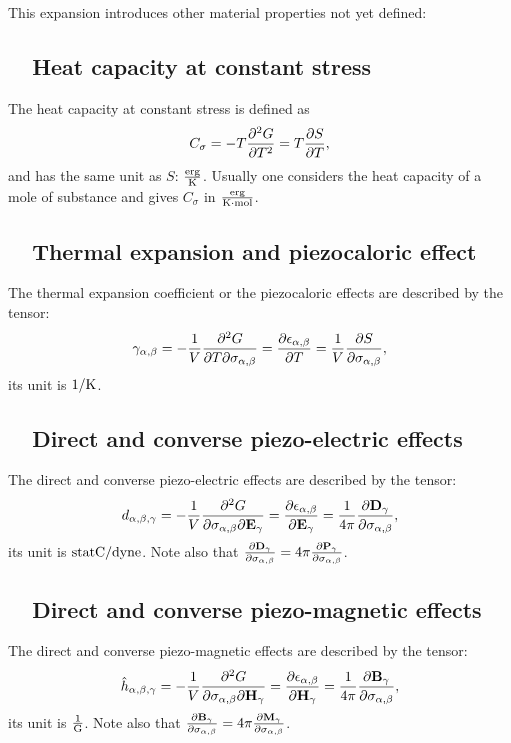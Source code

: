 \documentclass[12pt,a4paper,twoside]{report}
\begin{document}
{This expansion introduces other material properties not yet defined:
\subsection{\color{orange}\ \ Heat capacity at constant stress}
The heat capacity at constant stress is defined as
\begin{equation}
C_\sigma= - T {\partial^2 G \over \partial T^2} = 
T {\partial S \over \partial T},
\end{equation}
and has the same unit as $S$: ${\rm erg}\over {\rm K}$. Usually one considers the heat
capacity of a mole of substance and gives $C_\sigma$ in 
${{\rm erg} \over {\rm K} \cdot {\rm mol}}$.

\subsection{\color{orange}\ \ Thermal expansion and piezocaloric effect}
The thermal expansion coefficient or the piezocaloric effects are
described by the tensor:
\begin{equation}
\gamma_{\alpha,\beta}=-{1\over V} {\partial^2 G \over \partial T 
\partial \sigma_{\alpha,\beta}}={\partial \epsilon_{\alpha,\beta} \over 
\partial T}= {1\over V}
{\partial S \over \partial \sigma_{\alpha,\beta}},
\end{equation}
its unit is $1/{\rm K}$.

\subsection{\color{orange}\ \ Direct and converse piezo-electric effects}
The direct and converse piezo-electric effects are described by the 
tensor:
\begin{equation}
d_{\alpha,\beta,\gamma}=-{1\over V} {\partial^2 G \over
\partial \sigma_{\alpha,\beta} \partial {\bf E}_\gamma}=
{\partial \epsilon_{\alpha,\beta} \over \partial {\bf E}_\gamma}= 
{1\over 4\pi}{\partial {\bf D}_\gamma \over \partial \sigma_{\alpha,\beta}},
\end{equation}
its unit is ${\rm statC}/{\rm dyne}$. Note also that 
${\partial {\bf D}_\gamma \over \partial \sigma_{\alpha,\beta}}
=4\pi {\partial {\bf P}_\gamma \over \partial \sigma_{\alpha,\beta}}$.

\subsection{\color{orange}\ \ Direct and converse piezo-magnetic effects}
The direct and converse piezo-magnetic effects are described by the 
tensor:
\begin{equation}
\hat h_{\alpha,\beta,\gamma}=-{1\over V} {\partial^2 G \over
\partial \sigma_{\alpha,\beta} \partial {\bf H}_\gamma}= 
{\partial \epsilon_{\alpha,\beta} \over \partial {\bf H}_\gamma}= 
{1 \over 4 \pi}{\partial {\bf B}_\gamma \over \partial \sigma_{\alpha,\beta}},
\end{equation}
its unit is ${1\over {\rm G}}$. Note also that 
${\partial {\bf B}_\gamma \over \partial \sigma_{\alpha,\beta}}
=4 \pi {\partial {\bf M}_\gamma \over \partial \sigma_{\alpha,\beta}}$.

}
\end{document}

